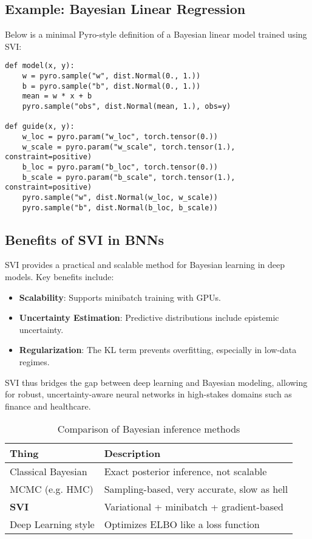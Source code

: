 \documentclass[11pt]{article}
\begin{document}
\subsection{Example: Bayesian Linear Regression}

Below is a minimal Pyro-style definition of a Bayesian linear model trained using SVI:

\begin{verbatim}
def model(x, y):
    w = pyro.sample("w", dist.Normal(0., 1.))
    b = pyro.sample("b", dist.Normal(0., 1.))
    mean = w * x + b
    pyro.sample("obs", dist.Normal(mean, 1.), obs=y)

def guide(x, y):
    w_loc = pyro.param("w_loc", torch.tensor(0.))
    w_scale = pyro.param("w_scale", torch.tensor(1.), constraint=positive)
    b_loc = pyro.param("b_loc", torch.tensor(0.))
    b_scale = pyro.param("b_scale", torch.tensor(1.), constraint=positive)
    pyro.sample("w", dist.Normal(w_loc, w_scale))
    pyro.sample("b", dist.Normal(b_loc, b_scale))
\end{verbatim}

\subsection{Benefits of SVI in BNNs}

SVI provides a practical and scalable method for Bayesian learning in deep models. Key benefits include:

\begin{itemize}
    \item \textbf{Scalability}: Supports minibatch training with GPUs.
    \item \textbf{Uncertainty Estimation}: Predictive distributions include epistemic uncertainty.
    \item \textbf{Regularization}: The KL term prevents overfitting, especially in low-data regimes.
\end{itemize}

SVI thus bridges the gap between deep learning and Bayesian modeling, allowing for robust, uncertainty-aware neural networks in high-stakes domains such as finance and healthcare.

\begin{table}[h]
\centering
\begin{tabular}{| l | p{10cm} |}
\hline
\textbf{Thing} & \textbf{Description} \\
\hline
Classical Bayesian & Exact posterior inference, not scalable \\
MCMC (e.g. HMC) & Sampling-based, very accurate, slow as hell \\
\textbf{SVI} & Variational + minibatch + gradient-based \\
Deep Learning style & Optimizes ELBO like a loss function \\
\hline
\end{tabular}
\caption{Comparison of Bayesian inference methods}
\end{table}
\end{document}
